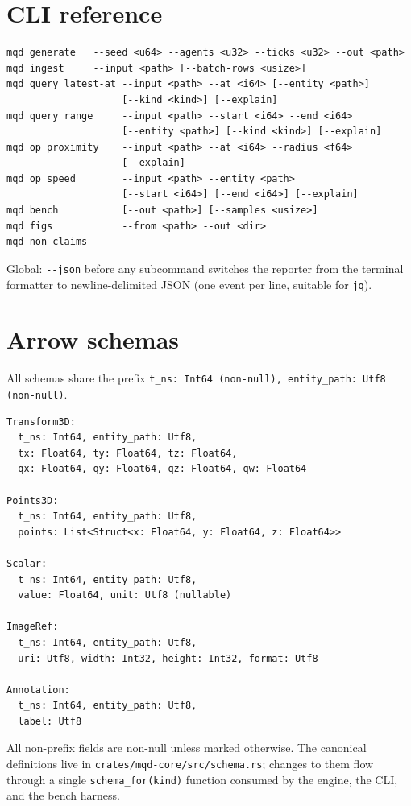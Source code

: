 \documentclass[11pt]{article}
\begin{document}
\section{CLI reference}
\label{app:cli}

\begin{lstlisting}
mqd generate   --seed <u64> --agents <u32> --ticks <u32> --out <path>
mqd ingest     --input <path> [--batch-rows <usize>]
mqd query latest-at --input <path> --at <i64> [--entity <path>]
                    [--kind <kind>] [--explain]
mqd query range     --input <path> --start <i64> --end <i64>
                    [--entity <path>] [--kind <kind>] [--explain]
mqd op proximity    --input <path> --at <i64> --radius <f64>
                    [--explain]
mqd op speed        --input <path> --entity <path>
                    [--start <i64>] [--end <i64>] [--explain]
mqd bench           [--out <path>] [--samples <usize>]
mqd figs            --from <path> --out <dir>
mqd non-claims
\end{lstlisting}

Global: \texttt{-{}-json} before any subcommand switches the reporter from the
terminal formatter to newline-delimited JSON (one event per line, suitable for
\texttt{jq}).

\section{Arrow schemas}
\label{app:schemas}

All schemas share the prefix
\texttt{t\_ns: Int64 (non-null), entity\_path: Utf8 (non-null)}.

\begin{lstlisting}
Transform3D:
  t_ns: Int64, entity_path: Utf8,
  tx: Float64, ty: Float64, tz: Float64,
  qx: Float64, qy: Float64, qz: Float64, qw: Float64

Points3D:
  t_ns: Int64, entity_path: Utf8,
  points: List<Struct<x: Float64, y: Float64, z: Float64>>

Scalar:
  t_ns: Int64, entity_path: Utf8,
  value: Float64, unit: Utf8 (nullable)

ImageRef:
  t_ns: Int64, entity_path: Utf8,
  uri: Utf8, width: Int32, height: Int32, format: Utf8

Annotation:
  t_ns: Int64, entity_path: Utf8,
  label: Utf8
\end{lstlisting}

All non-prefix fields are non-null unless marked otherwise. The canonical definitions
live in \texttt{crates/mqd-core/src/schema.rs}; changes to them flow through a single
\texttt{schema\_for(kind)} function consumed by the engine, the CLI, and the bench
harness.
\end{document}
